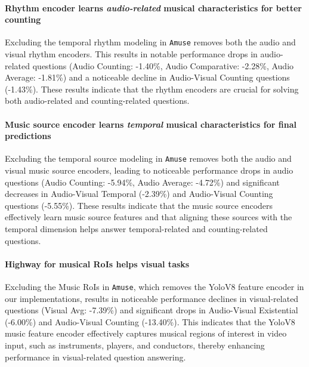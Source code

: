 \documentclass[11pt]{article}
\begin{document}
\paragraph{Rhythm encoder learns \textit{audio-related} musical characteristics for better counting} Excluding the temporal rhythm modeling in \texttt{Amuse} removes both the audio and visual rhythm encoders. This results in notable performance drops in audio-related questions (Audio Counting: -1.40\%, Audio Comparative: -2.28\%, Audio Average: -1.81\%) and a noticeable decline in Audio-Visual Counting questions (-1.43\%). These results indicate that the rhythm encoders are crucial for solving both audio-related and counting-related questions.


\paragraph{Music source encoder learns \textit{temporal} musical characteristics for final predictions} Excluding the temporal source modeling in \texttt{Amuse} removes both the audio and visual music source encoders, leading to noticeable performance drops in audio questions (Audio Counting: -5.94\%, Audio Average: -4.72\%) and significant decreases in Audio-Visual Temporal (-2.39\%) and Audio-Visual Counting questions (-5.55\%). These results indicate that the music source encoders effectively learn music source features and that aligning these sources with the temporal dimension helps answer temporal-related and counting-related questions.


\paragraph{Highway for musical RoIs helps visual tasks} Excluding the Music RoIs in \texttt{Amuse}, which removes the YoloV8 feature encoder in our implementations, results in noticeable performance declines in visual-related questions (Visual Avg: -7.39\%) and significant drops in Audio-Visual Existential (-6.00\%) and Audio-Visual Counting (-13.40\%). This indicates that the YoloV8 music feature encoder effectively captures musical regions of interest in video input, such as instruments, players, and conductors, thereby enhancing performance in visual-related question answering.
\end{document}
